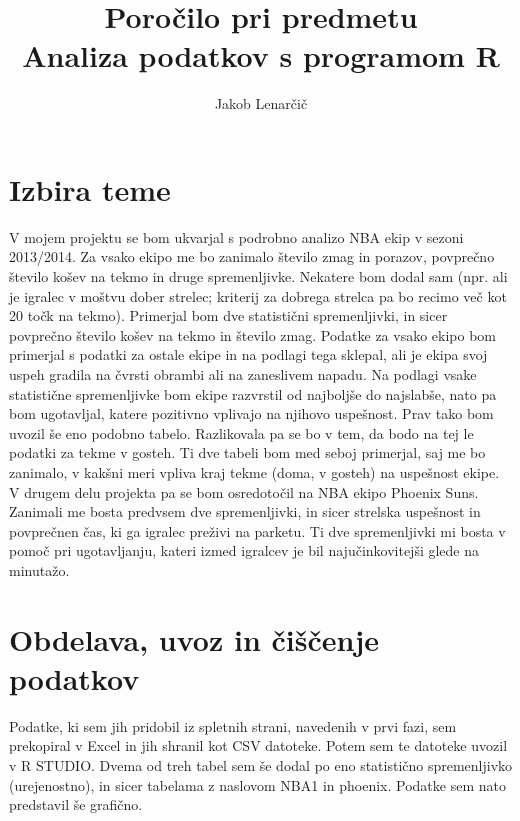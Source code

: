 \documentclass[11pt,a4paper]{article}
\begin{document}
\title{Poročilo pri predmetu \\
Analiza podatkov s programom R}
\author{Jakob Lenarčič}
\maketitle

\section{Izbira teme}

V mojem projektu se bom ukvarjal s podrobno analizo NBA ekip v sezoni 2013/2014. Za vsako ekipo me bo zanimalo število zmag in porazov, povprečno število košev na tekmo in druge spremenljivke. Nekatere bom dodal sam (npr. ali je igralec v moštvu dober strelec; kriterij za dobrega strelca pa bo recimo več kot 20 točk na tekmo). Primerjal bom dve statistični spremenljivki, in sicer povprečno število košev na tekmo in število zmag. Podatke za vsako ekipo bom primerjal s podatki za ostale ekipe in na podlagi tega sklepal, ali je ekipa svoj uspeh gradila na čvrsti obrambi ali na zaneslivem napadu. Na podlagi vsake statistične spremenljivke bom ekipe razvrstil od najboljše do najslabše, nato pa bom ugotavljal, katere pozitivno vplivajo na njihovo uspešnost.
Prav tako bom uvozil še eno podobno tabelo. Razlikovala pa se bo v tem, da bodo na tej le podatki za tekme v gosteh. Ti dve tabeli bom med seboj primerjal, saj me bo zanimalo, v kakšni meri vpliva kraj tekme (doma, v gosteh) na uspešnost ekipe.
V drugem delu projekta pa se bom osredotočil na NBA ekipo Phoenix Suns. Zanimali me bosta predvsem dve spremenljivki, in sicer strelska uspešnost in povprečnen čas, ki ga igralec preživi na parketu. Ti dve   spremenljivki mi bosta v pomoč pri ugotavljanju, kateri izmed igralcev je bil najučinkovitejši glede na minutažo.



\section{Obdelava, uvoz in čiščenje podatkov}

Podatke, ki sem jih pridobil iz spletnih strani, navedenih v prvi fazi, sem prekopiral v Excel in jih shranil kot CSV datoteke. Potem sem te datoteke uvozil v R STUDIO. Dvema od treh tabel sem še dodal po eno statistično spremenljivko (urejenostno), in sicer tabelama z naslovom NBA1 in phoenix. Podatke sem nato predstavil še grafično.
\end{document}
